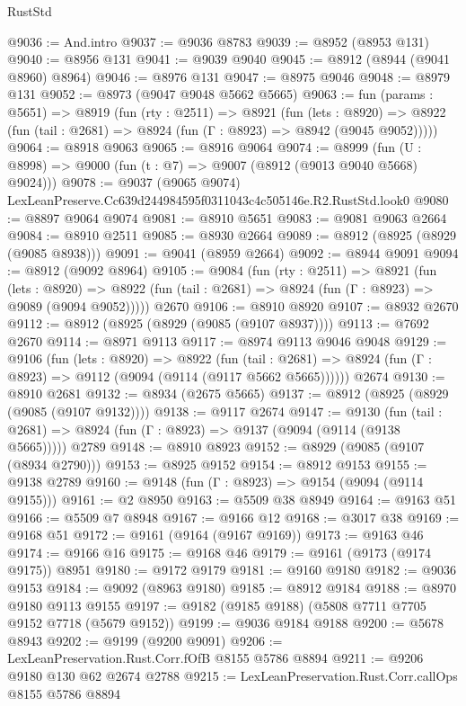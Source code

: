 \begin{lexlean}{RustStd}
\begin{coremodule}
@9036 := And.intro
@9037 := @9036 @8783
@9039 := @8952 (@8953 @131)
@9040 := @8956 @131
@9041 := @9039 @9040
@9045 := @8912 (@8944 (@9041 @8960) @8964)
@9046 := @8976 @131
@9047 := @8975 @9046
@9048 := @8979 @131
@9052 := @8973 (@9047 @9048 @5662 @5665)
@9063 := fun (params : @5651) =>
  @8919
    (fun (rty : @2511) =>
    @8921
      (fun (lets : @8920) =>
      @8922 (fun (tail : @2681) => @8924 (fun (Γ : @8923) => @8942 (@9045 @9052)))))
@9064 := @8918 @9063
@9065 := @8916 @9064
@9074 := @8999 (fun (U : @8998) => @9000 (fun (t : @7) => @9007 (@8912 (@9013 @9040 @5668) @9024)))
@9078 := @9037 (@9065 @9074) LexLeanPreserve.Cc639d244984595f0311043c4c505146e.R2.RustStd.look0
@9080 := @8897 @9064 @9074
@9081 := @8910 @5651
@9083 := @9081 @9063 @2664
@9084 := @8910 @2511
@9085 := @8930 @2664
@9089 := @8912 (@8925 (@8929 (@9085 @8938)))
@9091 := @9041 (@8959 @2664)
@9092 := @8944 @9091
@9094 := @8912 (@9092 @8964)
@9105 := @9084
    (fun (rty : @2511) =>
    @8921
      (fun (lets : @8920) =>
      @8922 (fun (tail : @2681) => @8924 (fun (Γ : @8923) => @9089 (@9094 @9052)))))
    @2670
@9106 := @8910 @8920
@9107 := @8932 @2670
@9112 := @8912 (@8925 (@8929 (@9085 (@9107 @8937))))
@9113 := @7692 @2670
@9114 := @8971 @9113
@9117 := @8974 @9113 @9046 @9048
@9129 := @9106
    (fun (lets : @8920) =>
    @8922
      (fun (tail : @2681) => @8924 (fun (Γ : @8923) => @9112 (@9094 (@9114 (@9117 @5662 @5665))))))
    @2674
@9130 := @8910 @2681
@9132 := @8934 (@2675 @5665)
@9137 := @8912 (@8925 (@8929 (@9085 (@9107 @9132))))
@9138 := @9117 @2674
@9147 := @9130
    (fun (tail : @2681) => @8924 (fun (Γ : @8923) => @9137 (@9094 (@9114 (@9138 @5665)))))
    @2789
@9148 := @8910 @8923
@9152 := @8929 (@9085 (@9107 (@8934 @2790)))
@9153 := @8925 @9152
@9154 := @8912 @9153
@9155 := @9138 @2789
@9160 := @9148 (fun (Γ : @8923) => @9154 (@9094 (@9114 @9155)))
@9161 := @2 @8950
@9163 := @5509 @38 @8949
@9164 := @9163 @51
@9166 := @5509 @7 @8948
@9167 := @9166 @12
@9168 := @3017 @38
@9169 := @9168 @51
@9172 := @9161 (@9164 (@9167 @9169))
@9173 := @9163 @46
@9174 := @9166 @16
@9175 := @9168 @46
@9179 := @9161 (@9173 (@9174 @9175)) @8951
@9180 := @9172 @9179
@9181 := @9160 @9180
@9182 := @9036 @9153
@9184 := @9092 (@8963 @9180)
@9185 := @8912 @9184
@9188 := @8970 @9180 @9113 @9155
@9197 := @9182 (@9185 @9188) (@5808 @7711 @7705 @9152 @7718 (@5679 @9152))
@9199 := @9036 @9184 @9188
@9200 := @5678 @8943
@9202 := @9199 (@9200 @9091)
@9206 := LexLeanPreservation.Rust.Corr.fOfB @8155 @5786 @8894
@9211 := @9206 @9180 @130 @62 @2674 @2788
@9215 := LexLeanPreservation.Rust.Corr.callOps @8155 @5786 @8894

\end{coremodule}
\end{lexlean}
